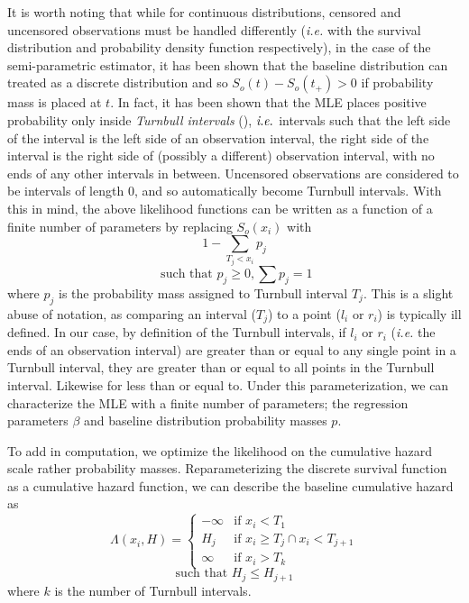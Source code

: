 \documentclass[article]{jss}
\begin{document}
	 It is worth noting that while for continuous distributions, censored and uncensored observations must be handled differently (\emph{i.e.} with the survival distribution and probability density function respectively), in the case of the semi-parametric estimator, it has been shown that the baseline distribution can treated as a discrete distribution and so $S_o(t) - S_o(t_+) > 0$ if probability mass is placed at $t$. In fact, it has been shown that the MLE places positive probability only inside \emph{Turnbull intervals} (\cite{Turnbull_1976}), $\emph{i.e.}$ intervals such that the left side of the interval is the left side of an observation interval, the right side of the interval is the right side of (possibly a different) observation interval, with no ends of any other intervals in between.   Uncensored observations are considered to be intervals of length 0, and so automatically become Turnbull intervals. With this in mind, the above likelihood functions can be written as a function of a finite number of parameters by replacing $	S_o(x_i)  $
with  
\[
1 - \displaystyle \sum_{T_j < x_i} p_j 
\]
\[
\text{ such that }   p_j \geq 0, \sum p_j = 1
\]	 
	 where $p_j$ is the probability mass assigned to Turnbull interval $T_j$. This is a slight abuse of notation, as comparing an interval ($T_j$) to a point ($l_i$ or $r_i$) is typically ill defined. In our case, by definition of the Turnbull intervals, if $l_i$ or $r_i$ (\emph{i.e.} the ends of an observation interval) are greater than or equal to any single point in a Turnbull interval, they are greater than or equal to all points in the Turnbull interval. Likewise for less than or equal to. Under this parameterization, we can characterize the MLE with a finite number of parameters; the regression parameters $\beta$ and baseline distribution probability masses $p$. 

	To add in computation, we optimize the likelihood on the cumulative hazard scale rather probability masses. Reparameterizing the discrete survival function as a cumulative hazard function, we can describe the baseline cumulative hazard as	
	\[
	\Lambda(x_i, H) = 	\begin{cases} -\infty 	& \text{if } x_i < T_1\\
							      H_j	& \text{if } x_i \geq T_j \cap x_i < T_{j+1}	\\
							      \infty 	& \text{if } x_i > T_k	
					\end{cases}					
	\]
	\[
	\text{such that }H_j \leq H_{j+1}
	\]
	where $k$ is the number of Turnbull intervals.
	
\end{document}
